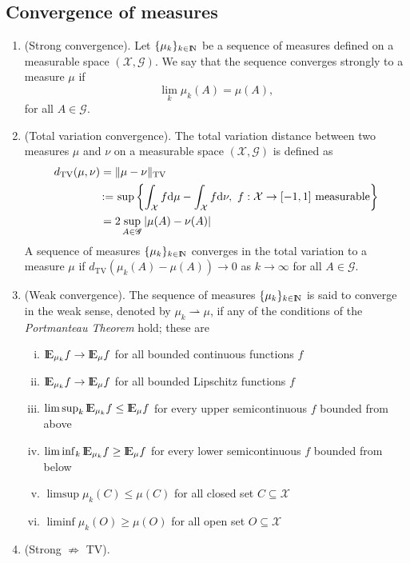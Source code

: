 \documentclass[a4paper,10pt]{article}
\begin{document}
\subsection{Convergence of measures}
\begin{enumerate}
 \item (Strong convergence). Let $\{\mu_k\}_{k\in\N}$ be a sequence of measures defined on a 
       measurable space $(\mathcal{X}, \mathscr{G})$. We say that the sequence converges strongly
       to a measure $\mu$ if
       \[
        \lim_k \mu_k(A) = \mu(A),
       \]
      for all $A\in\mathscr{G}$.
 \item (Total variation convergence). The total variation distance between two measures $\mu$ and 
       $\nu$ on a measurable space $(\mathcal{X}, \mathscr{G})$ is defined as
       \begin{align*}
        d_{\mathrm{TV}}(\mu,\nu) &= \|\mu-\nu\|_{\mathrm{TV}} \\
          &{}\mathop{\mathrel{:}=}{} \sup \left\{\int_{\mathcal{X}}f\mathrm{d}\mu - \int_{\mathcal{X}}f \mathrm{d} \nu,\ f:\mathcal{X}\to[-1,1] \text{ measurable} \right\}\\
          &=2\sup_{A\in\mathscr{G}}|\mu(A) - \nu(A)|
       \end{align*}
      A sequence of measures $\{\mu_k\}_{k\in\N}$ converges in the total variation
      to a measure $\mu$ if $d_{\mathrm{TV}}(\mu_k(A)-\mu(A))\to 0$ as $k\to\infty$
      for all $A\in\mathscr{G}$.
 \item (Weak convergence). The sequence of measures $\{\mu_k\}_{k\in\N}$ is said to converge 
       in the weak sense, denoted by $\mu_k \rightharpoonup \mu$, if any of the conditions 
       of the \textit{Portmanteau Theorem} hold; these are
       \begin{enumerate}[i.]
        \item $\E_{\mu_k} f\to \E_{\mu} f$ for all bounded continuous functions $f$
        \item $\E_{\mu_k} f\to \E_{\mu} f$ for all bounded Lipschitz functions $f$
        \item $\limsup_k\E_{\mu_k} f \leq \E_{\mu} f$ for every upper semicontinuous $f$ bounded from above
        \item $\liminf_k\E_{\mu_k} f \geq \E_{\mu} f$ for every lower semicontinuous $f$ bounded from below
        \item $\limsup \mu_k(C) \leq \mu(C)$ for all closed set $C\subseteq \mathcal{X}$
        \item $\liminf \mu_k(O) \geq \mu(O)$ for all open set $O\subseteq \mathcal{X}$
       \end{enumerate}
 \item (Strong $\nRightarrow$ TV).
\end{enumerate}
\end{document}
